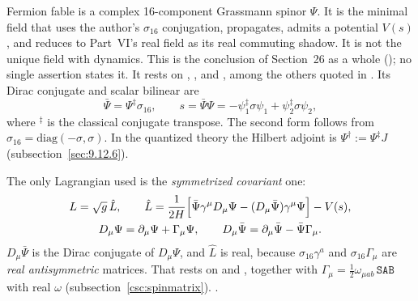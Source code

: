 Fermion fable is a complex 16-component Grassmann spinor $\Psi$. It is the minimal field that uses
the author's $\sigma_{16}$ conjugation, propagates, admits a potential $V(s)$, and reduces to
Part~VI's real field as its real commuting shadow. It is not the unique field with dynamics. This is
the conclusion of Section~26 as a whole (); no single assertion states it. It rests on
 , ,
 and , among the others quoted in . Its
Dirac conjugate and scalar bilinear are
\begin{equation}
  \bar\Psi=\Psi^{\ddagger}\sigma_{16},\qquad
  s=\bar\Psi\Psi=-\psi_1^{\ddagger}\sigma\psi_1+\psi_2^{\ddagger}\sigma\psi_2,
\end{equation}
where ${}^\ddagger$ is the classical conjugate transpose. The second form follows from
$\sigma_{16}=\mathrm{diag}(-\sigma,\sigma)$. In the quantized theory the Hilbert adjoint is
$\Psi^\dagger:=\Psi^\ddagger J$ (subsection~\ref{sec:9.12.6}).

The only Lagrangian used is the \emph{symmetrized covariant} one:
\begin{gather}
  L=\sqrt g\,\hat L,\qquad
  \hat L=\frac{1}{2H}\Bigl[\bar\Psi\gamma^\mu D_\mu\Psi-(D_\mu\bar\Psi)\gamma^\mu\Psi\Bigr]-V(s),\label{csc:eq:Lsym}\\
  D_\mu\Psi=\partial_\mu\Psi+\Gamma_\mu\Psi,\qquad
  D_\mu\bar\Psi=\partial_\mu\bar\Psi-\bar\Psi\Gamma_\mu .\notag
\end{gather}
$D_\mu\bar\Psi$ is the Dirac conjugate of $D_\mu\Psi$, and $\hat L$ is real, because
$\sigma_{16}\gamma^a$ and $\sigma_{16}\Gamma_\mu$ are \emph{real antisymmetric} matrices. That rests
on   and
, together with
$\Gamma_\mu=\tfrac12\omega_{\mu ab}\,\texttt{SAB}$ with real $\omega$
(subsection~\ref{csc:spinmatrix}).  .

